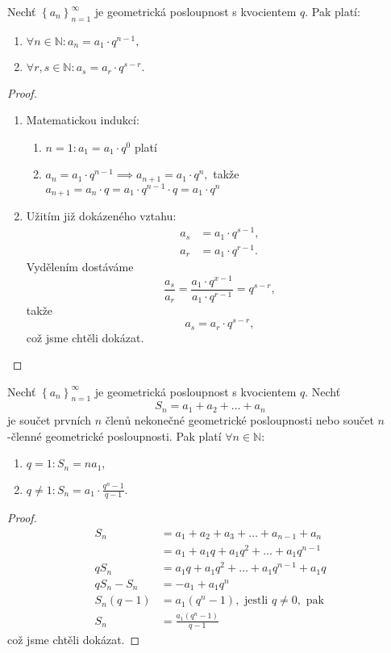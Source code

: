 \begin{veta}
    Nechť $\left \{ a_n \right \}_{n=1}^\infty $ je geometrická posloupnost s kvocientem
    $q$. Pak platí:
    \begin{enumerate}[$i.$]
    \item $\forall n\in \mathbb N: a_n = a_1 \cdot q^{n-1},$
   	\item $\forall r,s \in \mathbb N: a_s = a_r \cdot q^{s-r}.$
    \end{enumerate}
\end{veta}

\begin{proof}
\begin{enumerate}[$i.$]
\item Matematickou indukcí:
\begin{enumerate}[1.]
\item $n=1: a_1 = a_1\cdot q^0$ platí
\item $a_n = a_1\cdot q^{n-1}\implies a_{n+1}=a_1\cdot q^n,$ takže $a_{n+1}=a_n\cdot q=a_1\cdot q^{n-1}\cdot q=a_1\cdot q^n$
\end{enumerate}
\item Užitím již dokázeného vztahu:
\begin{align*}
    a_s &= a_1\cdot q^{s-1},\\
    a_r &= a_1\cdot q^{r-1}.
\end{align*}
Vydělením dostáváme
$$\frac{a_s}{a_r} = \frac{a_1\cdot q^{x-1}}{a_1\cdot q^{r-1}}=q^{s-r},$$
takže
$$a_s=a_r\cdot q^{s-r},$$
což jsme chtěli dokázat.\qedhere
\end{enumerate}
\end{proof}

\begin{veta}
Nechť $\left \{ a_n \right \}_{n=1}^\infty $ je geometrická posloupnost s kvocientem
$q$. Nechť
$$S_n=a_1+a_2+\dots+a_n$$
je součet prvních $n$ členů nekonečné geometrické posloupnosti nebo součet
$n$-členné geometrické posloupnosti. Pak platí $\forall n \in \mathbb N$:
\begin{enumerate}[$i.$]
\item $q=1: S_n=na_1,$
\item $q\ne 1: S_n = a_1\cdot \frac{q^n-1}{q-1}.$
\end{enumerate}
\end{veta}

\begin{proof}
\begin{align*}
    S_n &= a_1+a_2+a_3+\dots+a_{n-1}+a_n \\
    &= a_1 + a_1q+ a_1q^2+ \dots + a_1q^{n-1}\\
    qS_n &= a_1q + a_1q^2 +  \dots + a_1q^{n-1} + a_1q\\
    qS_n-S_n &= -a_1+a_1q^n\\
    S_n(q-1) &= a_1(q^n-1), \textrm{ jestli } q\ne 0, \textrm{ pak}\\
    S_n &= \frac{a_1(q^n-1)}{q-1}
\end{align*}
což jsme chtěli dokázat. \qedhere
\end{proof}

